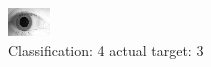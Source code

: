 \begin{figure}[h!]
\begin{center}
\includegraphics[width=0.60\columnwidth]{figures/ID1967_class_4_target_3.png}
\end{center}
\caption{ Classification: 4 actual target: 3}
\label{fig:ID1967_class_4_target_3}
\end{figure}

